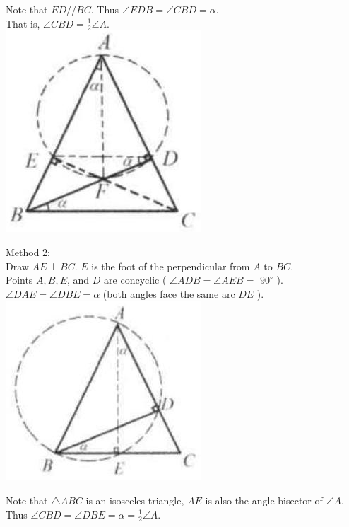\documentclass{article}
\begin{document}
Note that \(E D / / B C\). Thus \(\angle E D B=\angle C B D=\alpha\).\\
That is, \(\angle C B D=\frac{1}{2} \angle A\).\\
\centering
\includegraphics[width=\textwidth]{images/194.jpg}

Method 2:\\
Draw \(A E \perp B C\). \(E\) is the foot of the perpendicular from \(A\) to \(B C\).\\
Points \(A, B, E\), and \(D\) are concyclic ( \(\angle A D B=\angle A E B=\) \(90^{\circ}\) ).\\
\(\angle D A E=\angle D B E=\alpha\) (both angles face the same arc \(D E\) ).\\
\centering
\includegraphics[width=\textwidth]{images/194(1).jpg}

Note that \(\triangle A B C\) is an isosceles triangle, \(A E\) is also the angle bisector of \(\angle A\).\\
Thus \(\angle C B D=\angle D B E=\alpha=\frac{1}{2} \angle A\).
\end{document}
